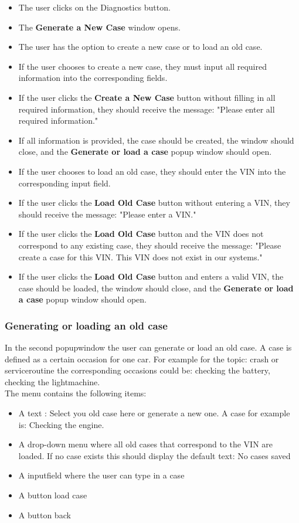 \documentclass[]{scrreprt}
\begin{document}
\begin{itemize}
    \item The user clicks on the Diagnostics button.
    \item The \textbf{Generate a New Case} window opens.
    \item The user has the option to create a new case or to load an old case.
    \item If the user chooses to create a new case, they must input all required information into the corresponding fields.
    \item If the user clicks the \textbf{Create a New Case} button without filling in all required information, they should receive the message: "Please enter all required information."
    \item If all information is provided, the case should be created, the window should close, and the \textbf{Generate or load a case} popup window should open.
    \item If the user chooses to load an old case, they should enter the VIN into the corresponding input field.
    \item If the user clicks the \textbf{Load Old Case} button without entering a VIN, they should receive the message: "Please enter a VIN."
    \item If the user clicks the \textbf{Load Old Case} button and the VIN does not correspond to any existing case, they should receive the message: "Please create a case for this VIN. This VIN does not exist in our systems."
    \item If the user clicks the \textbf{Load Old Case} button and enters a valid VIN, the case should be loaded, the window should close, and the \textbf{Generate or load a case} popup window should open.
\end{itemize}


\subsubsection{Generating or loading an old case}




In the second popupwindow the user can generate or load an old case. A case is defined as a certain occasion for one car. For example for the topic: crash or serviceroutine the corresponding occasions could be: checking the battery,
checking the lightmachine.
\\
The menu contains the following items:
\begin{itemize}
    \item A text : Select you old case here or generate a new one. A case for example is: Checking the engine.
    \item A drop-down menu where all old cases that correspond to the VIN are loaded. If no case exists this should display the default text: No cases saved
    \item A inputfield where the user can type in a case
    \item A button load case
    \item A button back
\end{itemize}
\end{document}
